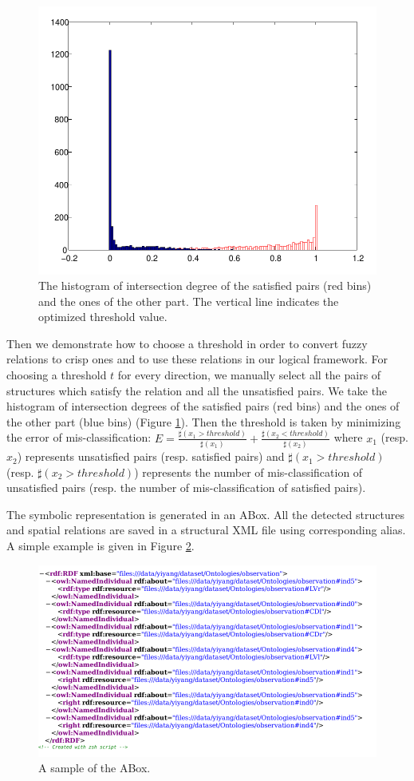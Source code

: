 \documentclass{article}
\begin{document}
\begin{figure}[h]
 \centering
 \includegraphics[width=.5\textwidth]{./figures/right_nright_thresh_crop.pdf}
 \caption{\label{fig:thresh}The histogram of intersection degree of the satisfied pairs (red bins) and the ones of the other part. The vertical line indicates the optimized threshold value.}
\end{figure}

Then we demonstrate how to choose a threshold in order to convert fuzzy relations to crisp ones and to use these relations in our logical framework.
For choosing a threshold $t$ for every direction, we manually select all the pairs of structures which satisfy the relation and all the unsatisfied pairs.
We take the histogram of intersection degrees of the satisfied pairs (red bins) and the ones of the other part (blue bins) (Figure \ref{fig:thresh}).
Then the threshold is taken by minimizing the error of mis-classification:
$E=\frac{\sharp(x_1>threshold)}{\sharp(x_1)}+\frac{\sharp(x_2<threshold)}{\sharp(x_2)}$ where $x_1$ (resp. $x_2$) represents unsatisfied pairs (resp. satisfied pairs) 
and $\sharp(x_1>threshold)$ (resp. $\sharp(x_2>threshold)$) represents the number of mis-classification of unsatisfied pairs (resp. the number of mis-classification of satisfied pairs).

The symbolic representation is generated in an ABox. All the detected structures and spatial relations are saved in a structural XML file using corresponding alias.
A simple example is given in Figure \ref{fig:owlfile}.
\begin{figure}[h]
 \centering
 \includegraphics[width=.8\textwidth]{./figures/xml_screenshot.png}
 \caption{\label{fig:owlfile}A sample of the ABox.}
\end{figure}
\end{document}
